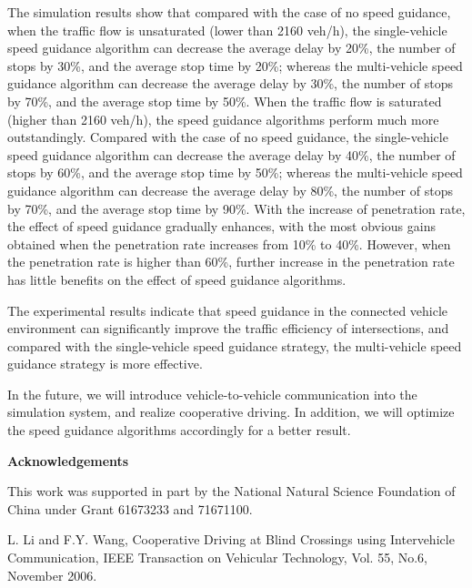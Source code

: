 \documentclass[10.5pt,compsoc]{TsT}
\theoremstyle{mystyle}
\begin{document}
{The simulation results show that compared with the case of no speed
guidance, when the traffic flow is unsaturated (lower than 2160 veh/h),
the single-vehicle speed guidance algorithm can decrease the average
delay by 20\%, the number of stops by 30\%, and the average stop time by
20\%; whereas the multi-vehicle speed guidance algorithm can decrease
the average delay by 30\%, the number of stops by 70\%, and the average
stop time by 50\%. When the traffic flow is saturated (higher than 2160
veh/h), the speed guidance algorithms perform much more outstandingly.
Compared with the case of no speed guidance, the single-vehicle speed
guidance algorithm can decrease the average delay by 40\%, the number of
stops by 60\%, and the average stop time by 50\%; whereas the
multi-vehicle speed guidance algorithm can decrease the average delay by
80\%, the number of stops by 70\%, and the average stop time by 90\%.
With the increase of penetration rate, the effect of speed guidance
gradually enhances, with the most obvious gains obtained when the
penetration rate increases from 10\% to 40\%. However, when the
penetration rate is higher than 60\%, further increase in the
penetration rate has little benefits on the effect of speed guidance
algorithms.

The experimental results indicate that speed guidance in the connected
vehicle environment can significantly improve the traffic efficiency of
intersections, and compared with the single-vehicle speed guidance
strategy, the multi-vehicle speed guidance strategy is more effective.

In the future, we will introduce vehicle-to-vehicle communication into
the simulation system, and realize cooperative driving. In addition, we
will optimize the speed guidance algorithms accordingly for a better
result.

\vskip 2mm
\noindent
\textbf{Acknowledgements}
\vskip 2mm

\noindent
This work was supported in part by the National Natural Science
Foundation of China under Grant 61673233 and 71671100.

\vskip 2mm

\renewcommand\refname{\zihao{5}\textbf{References}}


\begin{thebibliography}{99}
 \addtolength{\itemsep}{-1em}
\vspace {1.5mm}
L. Li and F.Y. Wang, Cooperative Driving at Blind Crossings using
Intervehicle Communication, IEEE Transaction on Vehicular Technology,
Vol. 55, No.6, November 2006.


\end{thebibliography}}
\end{document}
